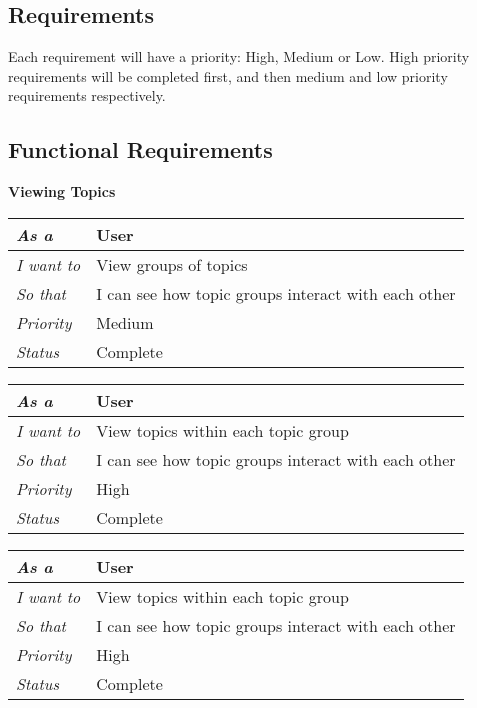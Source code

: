 \subsection{Requirements}
Each requirement will have a priority: High, Medium or Low. High priority requirements will be completed first, and then medium and low priority requirements respectively. \\

\subsection{Functional Requirements}

\textbf{Viewing Topics}
\FloatBarrier
\begin{table}[h!]
\begin{tabular}{|l|l|}
\hline
\textit{As a}      & User                                                \\ \hline
\textit{I want to} & View groups of topics                               \\ \hline
\textit{So that}   & I can see how topic groups interact with each other \\ \hline
\textit{Priority}  & {\color[HTML]{FE996B} Medium}                         \\ \hline
\textit{Status}    & Complete                                            \\ \hline
\end{tabular}
\end{table}


\begin{table}[h!]
\begin{tabular}{|l|l|}
\hline
\textit{As a}      & User                                                \\ \hline
\textit{I want to} & View topics within each topic group                 \\ \hline
\textit{So that}   & I can see how topic groups interact with each other \\ \hline
\textit{Priority}  & {\color[HTML]{FE0000} High}                         \\ \hline
\textit{Status}    & Complete                                            \\ \hline
\end{tabular}
\end{table}

\begin{table}[h!]
\begin{tabular}{|l|l|}
\hline
\textit{As a}      & User                                                \\ \hline
\textit{I want to} & View topics within each topic group                 \\ \hline
\textit{So that}   & I can see how topic groups interact with each other \\ \hline
\textit{Priority}  & {\color[HTML]{FE0000} High}                         \\ \hline
\textit{Status}    & Complete                                            \\ \hline
\end{tabular}
\end{table}

